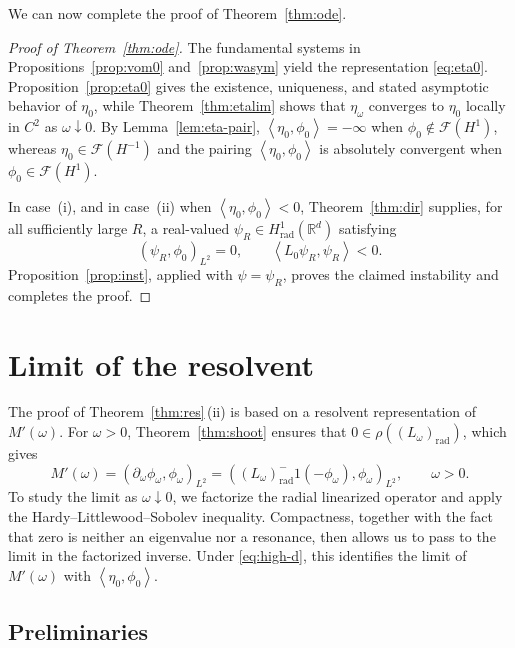\documentclass[12pt, a4paper, reqno]{amsart}
\numberwithin{equation}{section}
\theoremstyle{definition}
\theoremstyle{remark}
\newcommand{\R}{\mathbb R}
\newcommand{\cF}{\mathcal F}
\def\tbra[#1,#2]{{\left\langle #1,#2\right\rangle}}
\def\rbra[#1,#2]{{\left( #1,#2\right)}}
\newcommand{\rad}{\mathrm{rad}}
\newcommand{\pt}{\partial}
\begin{document}
We can now complete the proof of Theorem~\ref{thm:ode}.

\begin{proof}[Proof of Theorem~\ref{thm:ode}]
The fundamental systems in Propositions~\ref{prop:vom0}
and~\ref{prop:wasym} yield the representation \eqref{eq:eta0}.
Proposition~\ref{prop:eta0} gives the existence, uniqueness, and stated
asymptotic behavior of $\eta_0$, while Theorem~\ref{thm:etalim} shows that $\eta_\omega$ converges to $\eta_0$ locally in $C^2$ as $\omega\downarrow0$.
By Lemma~\ref{lem:eta-pair}, $\tbra[\eta_0,\phi_0]=-\infty$ when $\phi_0\notin\cF(H^1)$, whereas $\eta_0\in\cF(H^{-1})$ and the pairing
$\tbra[\eta_0,\phi_0]$ is absolutely convergent when $\phi_0\in\cF(H^1)$.

In case~\textup{(i)}, and in case~\textup{(ii)} when
$\tbra[\eta_0,\phi_0]<0$, Theorem~\ref{thm:dir} supplies, for all
sufficiently large $R$, a real-valued $\psi_R\in H^1_{\rad}(\R^d)$
satisfying
\[
  \rbra[\psi_R,\phi_0]_{L^2}=0,
  \qquad
  \tbra[L_0\psi_R,\psi_R]<0.
\]
Proposition~\ref{prop:inst}, applied with $\psi=\psi_R$, proves the
claimed instability and completes the proof.
\end{proof}


\section{Limit of the resolvent}\label{sec:res}

The proof of Theorem~\ref{thm:res}\,\textup{(ii)} is based on a resolvent
representation of $M'(\omega)$.
For $\omega>0$, Theorem~\ref{thm:shoot} ensures that
$0\in\rho((L_\omega)_{\rad})$, which gives
\begin{equation}\label{eq:Mres}
  M'(\omega)
  =\rbra[\pt_\omega\phi_\omega,\phi_\omega]_{L^2}
  =\rbra[(L_\omega)_{\rad}^{-1}(-\phi_\omega),\phi_\omega]_{L^2},
  \qquad \omega>0.
\end{equation}
To study the limit as $\omega\downarrow0$, we factorize the radial
linearized operator and apply the Hardy--Littlewood--Sobolev inequality.
Compactness, together with the fact that zero is neither an eigenvalue
nor a resonance, then allows us to pass to the limit in the factorized
inverse.
Under \eqref{eq:high-d}, this identifies the limit of $M'(\omega)$
with $\tbra[\eta_0,\phi_0]$.

\subsection{Preliminaries}
\end{document}
